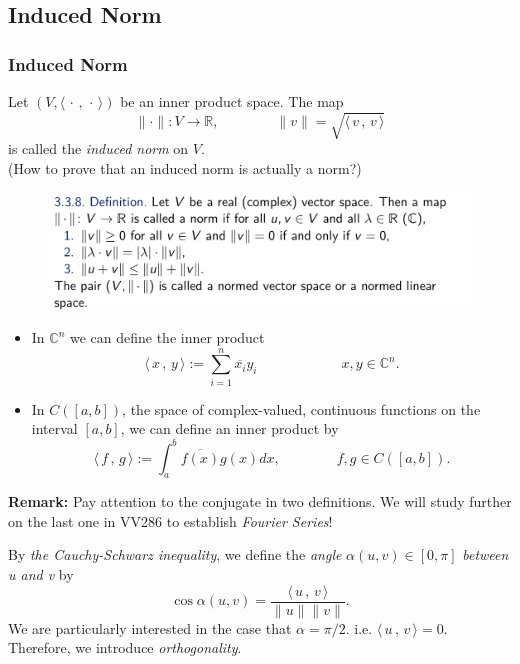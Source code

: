 \documentclass[12pt, t]{beamer}
\renewcommand{\emph}[1]{{\color{Turquoise3}\textsl{#1}}}
\newcommand{\C}{\mathbb{C}} \newcommand{\F}{\mathbb{F}} \newcommand{\R}{\mathbb{R}} \newcommand{\Q}{\mathbb{Q}}
\newcommand{\nullspace}{~\\[15pt]}
\newcommand{\remark}{\textbf{Remark: }}
\newcommand{\scp}[2]{\langle\,#1\,,\,#2\,\rangle} \newcommand{\scpp}{\langle\,\cdot\,,\,\cdot\,\rangle}
\begin{document}
\subsection{Induced Norm}
\begin{frame}[allowframebreaks]
    \frametitle{Induced Norm}
    Let $(V,\scpp)$ be an inner product space. The map
    \[\|\cdot\|:V\rightarrow\R,\qquad\qquad\|v\|=\sqrt{\scp{v}{v}}\]
    is called the \emph{induced norm} on $V$.
    \nullspace
    (How to prove that an induced norm is actually a norm?)

    \begin{figure}[H]
    \centering
    \includegraphics[width=\textwidth]{2020-05-20-13-53-34.png}
    \end{figure}
    
    \newpage
    \begin{itemize}
        \item In $\C^n$ we can define the inner product
            \begin{equation*}
              \scp{x}{y}:=\sum_{i=1}^{n}\overline{x_i}y_i\qquad\qquad
              \qquad x,y\in\C^n.
            \end{equation*}
            \vspace*{-4mm}
        \item In $C([a,b])$, the space of complex-valued, continuous functions on the interval $[a,b]$, we can define an inner product by
            \[\scp{f}{g}:=\int_{a}^{b}\overline{f(x)}g(x)dx,\qquad\qquad
            f,g\in C([a,b]).\]
      \end{itemize}
    \remark Pay attention to the conjugate in two definitions. We will study further on the last one in VV286 to establish \emph{Fourier Series}!

    \newpage
    By \textit{the Cauchy-Schwarz inequality}, we define the \emph{angle} $\alpha(u,v)\in[0,\pi]$ \emph{between u and v} by
    \begin{equation}
        \cos\alpha(u,v)=\frac{\scp{u}{v}}{\|u\|\|v\|}.
    \end{equation}
    We are particularly interested in the case that $\alpha=\pi/2$. i.e. $\scp{u}{v}=0$. Therefore, we introduce \emph{orthogonality}.
\end{frame}
\end{document}
